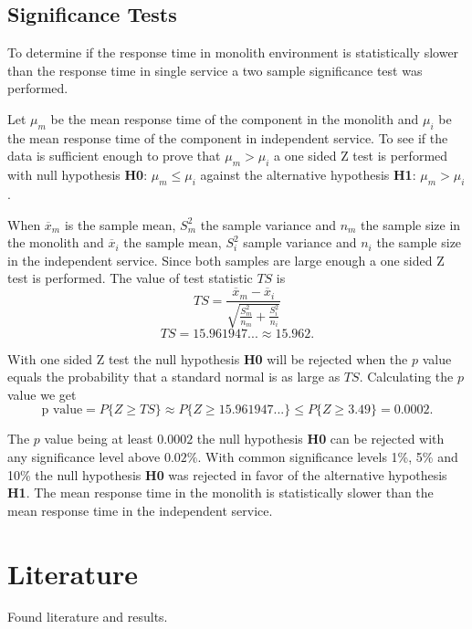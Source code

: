 \subsection{Significance Tests}
To determine if the response time in monolith environment is statistically slower than the response time in single service a two sample significance test was performed.

Let $\mu_m$ be the mean response time of the component in the monolith and $\mu_i$ be the mean response time of the component in independent service.
To see if the data is sufficient enough to prove that $\mu_m > \mu_i$ a one sided Z test is performed with null hypothesis \textbf{H0}: $\mu_m \leq \mu_i$ against the alternative hypothesis \textbf{H1}: $\mu_m > \mu_i$.

When $\overline{x}_m$ is the sample mean, $S_m^2$ the sample variance and $n_m$ the sample size in the monolith 
and $\overline{x}_i$ the sample mean, $S_i^2$ sample variance and $n_i$ the sample size in the independent service.
Since both samples are large enough a one sided Z test is performed.
The value of test statistic $TS$ is
\[
TS=\frac{\overline{x}_m-\overline{x}_i}{\sqrt{\frac{S_m^2}{n_m}+\frac{S_i^2}{n_i}}}
\]
\[
TS=15.961947... \approx 15.962
.\]
 
With one sided Z test the null hypothesis \textbf{H0} will be rejected when the $p$ value 
equals the probability that a standard normal is as large as $TS$. Calculating the $p$ value we get %
\[
\text{p value} = P\{Z\geq TS\} \approx P\{Z\geq 15.961947...\} \leq P\{Z\geq 3.49\} = 0.0002
.\]

The $p$ value being at least $0.0002$ the null hypothesis \textbf{H0} can be rejected with any significance level above $0.02\%$.
With common significance levels 1\%, 5\% and 10\% the null hypothesis \textbf{H0} was rejected in favor of the alternative hypothesis \textbf{H1}.
The mean response time in the monolith is statistically slower than the mean response time in the independent service.

\section{Literature}
Found literature and results.